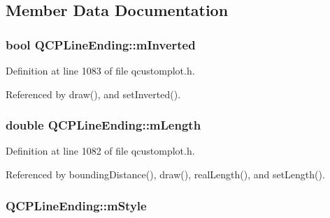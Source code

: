 \subsection{Member Data Documentation}
\hypertarget{class_q_c_p_line_ending_a91306fe771d54c955e0af21af14349d5}{}
\subsubsection[{m\+Inverted}]{\setlength{\rightskip}{0pt plus 5cm}bool Q\+C\+P\+Line\+Ending\+::m\+Inverted\hspace{0.3cm}{\ttfamily [protected]}}\label{class_q_c_p_line_ending_a91306fe771d54c955e0af21af14349d5}


Definition at line 1083 of file qcustomplot.\+h.



Referenced by draw(), and set\+Inverted().

\hypertarget{class_q_c_p_line_ending_ae8e1e2566b96c05736cd92662dba8af8}{}
\subsubsection[{m\+Length}]{\setlength{\rightskip}{0pt plus 5cm}double Q\+C\+P\+Line\+Ending\+::m\+Length\hspace{0.3cm}{\ttfamily [protected]}}\label{class_q_c_p_line_ending_ae8e1e2566b96c05736cd92662dba8af8}


Definition at line 1082 of file qcustomplot.\+h.



Referenced by bounding\+Distance(), draw(), real\+Length(), and set\+Length().

\hypertarget{class_q_c_p_line_ending_a4696fc9117b60f1ca7690fcd2ba56611}{}
\subsubsection[{m\+Style}]{ Q\+C\+P\+Line\+Ending\+::m\+Style\hspace{0.3cm}{\ttfamily [protected]}}\label{class_q_c_p_line_ending_a4696fc9117b60f1ca7690fcd2ba56611}


